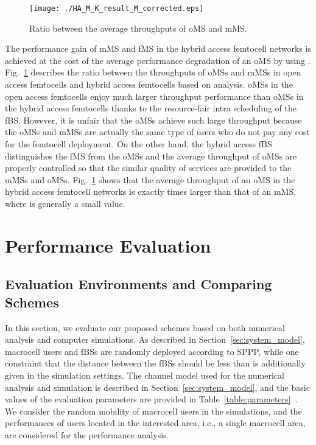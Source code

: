 \documentclass[journal]{IEEEtran}
\begin{document}
\begin{figure}
\begin{center}
\texttt{[image: ./HA\_M\_K\_result\_M\_corrected.eps]}
\caption{Ratio between the average throughputs of oMS and mMS.}
\label{fig:Ratio_MK}
\end{center}
\end{figure}
The performance gain of mMS and fMS in the  hybrid access femtocell networks
is achieved at the cost of the average performance degradation of an oMS
by using .
Fig.~\ref{fig:Ratio_MK} describes the ratio between the throughputs of
oMSs and mMSs
in open access femtocells and hybrid access femtocells based on analysis.
oMSs in the open access femtocells enjoy much larger throughput performance than oMSs in the hybrid access femtocells
thanks to the resource-fair intra scheduling of the fBS.
However, it is unfair that the oMSs achieve such large throughput because
the oMSs and mMSs are actually the same type of users who do not pay any cost for the femtocell deployment.
On the other hand, the hybrid access fBS distinguishes the fMS from the oMSs and the average throughput of
oMSs are properly controlled so that the similar quality of services are provided to the mMSs and oMSs.
Fig.~\ref{fig:Ratio_MK} shows that the average throughput of an oMS in  the hybrid access femtocell networks is
exactly  times larger than that of an mMS, where  is generally a small value.


\section{Performance Evaluation}
\label{sec:evaluation}
\subsection{Evaluation Environments and Comparing Schemes}
\label{sec:eval_environments}

In this section, we evaluate our proposed schemes based on both numerical analysis and computer simulations.
As described in Section~\ref{sec:system_model}, macrocell users and fBSs are randomly deployed according
to SPPP, while one constraint that the distance between the fBSs should be less than 
is additionally given in the simulation settings.
The channel model used for the numerical analysis and simulation is described in Section~\ref{sec:system_model}, and the basic values of the evaluation parameters are provided in Table~\ref{table:parameters}~\cite{twc10jo,itur.m.1225}.
We consider the random mobility of macrocell users in the simulations, and the performances of users located in the interested area, i.e., a single macrocell area, are considered for the performance analysis.
\end{document}
